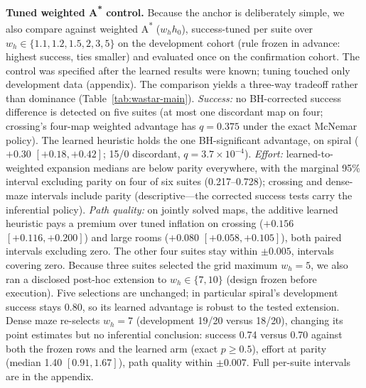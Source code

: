 \documentclass[letterpaper]{article} %
\begin{document}
\textbf{Tuned weighted A\textsuperscript{*} control.} Because the anchor is deliberately simple, we also compare against weighted A\textsuperscript{*} ($w_h h_0$), success-tuned per suite over $w_h \in \{1.1, 1.2, 1.5, 2, 3, 5\}$ on the development cohort (rule frozen in advance: highest success, ties smaller) and evaluated once on the confirmation cohort. The control was specified after the learned results were known; tuning touched only development data (appendix). The comparison yields a three-way tradeoff rather than dominance (Table~\ref{tab:wastar-main}). \emph{Success:} no BH-corrected success difference is detected on five suites (at most one discordant map on four; crossing's four-map weighted advantage has $q{=}0.375$ under the exact McNemar policy). The learned heuristic holds the one BH-significant advantage, on spiral ($+0.30$ $[+0.18,+0.42]$; 15/0 discordant, $q{=}3.7\times10^{-4}$). \emph{Effort:} learned-to-weighted expansion medians are below parity everywhere, with the marginal 95\% interval excluding parity on four of six suites (0.217--0.728); crossing and dense-maze intervals include parity (descriptive---the corrected success tests carry the inferential policy). \emph{Path quality:} on jointly solved maps, the additive learned heuristic pays a premium over tuned inflation on crossing ($+0.156$ $[+0.116,+0.200]$) and large rooms ($+0.080$ $[+0.058,+0.105]$), both paired intervals excluding zero. The other four suites stay within $\pm 0.005$, intervals covering zero. Because three suites selected the grid maximum $w_h{=}5$, we also ran a disclosed post-hoc extension to $w_h \in \{7, 10\}$ (design frozen before execution). Five selections are unchanged; in particular spiral's development success stays 0.80, so its learned advantage is robust to the tested extension. Dense maze re-selects $w_h{=}7$ (development 19/20 versus 18/20), changing its point estimates but no inferential conclusion: success 0.74 versus 0.70 against both the frozen rows and the learned arm (exact $p \geq 0.5$), effort at parity (median 1.40 $[0.91, 1.67]$), path quality within $\pm 0.007$. Full per-suite intervals are in the appendix.
\end{document}
